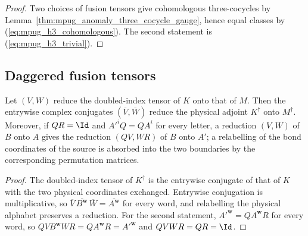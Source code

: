 \begin{proof}\leanok
    Two choices of fusion tensors give cohomologous three-cocycles by
    Lemma~\ref{thm:mpug_anomaly_three_cocycle_gauge}, hence equal classes
    by (\ref{eq:mpug_h3_cohomologous}). The second statement is
    (\ref{eq:mpug_h3_trivial}).
\end{proof}

\subsection{Daggered fusion tensors}

\begin{lemma}
    \label{thm:mpug_reduction_dagger}
    \leanok
    Let $(V,W)$ reduce the doubled-index tensor of $K$ onto that of $M$. Then
    the entrywise complex conjugates $(\overline V,\overline W)$ reduce the
    physical adjoint $K^\dagger$ onto $M^\dagger$. Moreover, if $Q R=\Id$ and
    $A'^{i}Q=QA^{i}$ for every letter, a reduction $(V,W)$ of $B$ onto $A$
    gives the reduction $(QV,WR)$ of $B$ onto $A'$; a relabelling of the bond
    coordinates of the source is absorbed into the two boundaries by the
    corresponding permutation matrices.
\end{lemma}

\begin{proof}\leanok
    The doubled-index tensor of $K^\dagger$ is the entrywise conjugate of that
    of $K$ with the two physical coordinates exchanged. Entrywise conjugation
    is multiplicative, so $\overline V\,\overline{B^{\mathbf w}}\,\overline W
        =\overline{A^{\mathbf w}}$ for every word, and relabelling the physical
    alphabet preserves a reduction. For the second statement,
    $A'^{\mathbf w}=QA^{\mathbf w}R$ for every word, so
    $QVB^{\mathbf w}WR=QA^{\mathbf w}R=A'^{\mathbf w}$ and $QVWR=QR=\Id$.
\end{proof}

